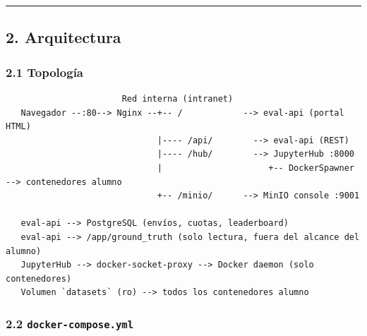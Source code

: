 \documentclass[11pt,a4paper]{article}
\begin{document}
\begin{center}\rule{0.5\linewidth}{0.5pt}\end{center}

\hypertarget{2-arquitectura}{%
\subsection{2. Arquitectura}\label{2-arquitectura}}

\hypertarget{21-topologuxeda}{%
\subsubsection{2.1 Topología}\label{21-topologuxeda}}

\begin{lstlisting}
                       Red interna (intranet)
   Navegador --:80--> Nginx --+-- /            --> eval-api (portal HTML)
                              |---- /api/        --> eval-api (REST)
                              |---- /hub/        --> JupyterHub :8000
                              |                     +-- DockerSpawner --> contenedores alumno
                              +-- /minio/      --> MinIO console :9001

   eval-api --> PostgreSQL (envíos, cuotas, leaderboard)
   eval-api --> /app/ground_truth (solo lectura, fuera del alcance del alumno)
   JupyterHub --> docker-socket-proxy --> Docker daemon (solo contenedores)
   Volumen `datasets` (ro) --> todos los contenedores alumno
\end{lstlisting}

\hypertarget{22-docker-composeyml}{%
\subsubsection{\texorpdfstring{2.2 \texttt{docker-\allowbreak{}compose.\allowbreak{}yml}}{2.2 docker-compose.yml}}\label{22-docker-composeyml}}
\end{document}
